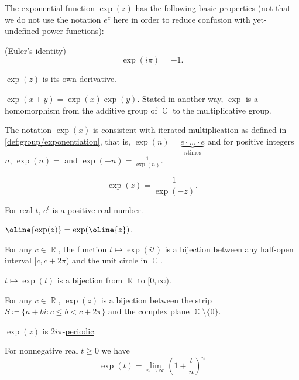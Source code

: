 \begin{proposition}\label{thm:def:exponential_function}
  The exponential function \( \exp(z) \) has the following basic properties (not that we do not use the notation \( e^z \) here in order to reduce confusion with yet-undefined power \hyperref[def:power_function]{functions}):

  \begin{thmenum}

     (Euler's identity)
    \begin{equation*}
      \exp(i \pi) = -1.
    \end{equation*}

     \( \exp(z) \) is its own derivative.

     \( \exp(x + y) = \exp(x) \exp(y) \). Stated in another way, \( \exp \) is a homomorphism from the additive group of \( \BbbC \) to the multiplicative group.

     The notation \( \exp(x) \) is consistent with iterated multiplication as defined in \cref{def:group/exponentiation}, that is, \( \exp(n) = \underbrace{e \cdot \ldots \cdot e}_{n \text{times}} \) and for positive integers \( n \), \( \exp(n) =  \) and \( \exp(-n) =\tfrac 1 {\exp(n)} \).

    \begin{equation*}
      \exp(z) = \frac 1 {\exp(-z)}.
    \end{equation*}

     For real \( t \), \( e^t \) is a positive real number.

     \( \oline{\exp(z)} = \exp(\oline{z}) \).

     For any \( c \in \BbbR \), the function \( t \mapsto \exp(it) \) is a bijection between any half-open interval \( [c, c + 2\pi) \) and the unit circle in \( \BbbC \).

     \( t \mapsto \exp(t) \) is a bijection from \( \BbbR \) to \( [0, \infty) \).

     For any \( c \in \BbbR \), \( \exp(z) \) is a bijection between the strip \( S \coloneqq \{ a + bi \colon c \leq b < c + 2\pi \} \) and the complex plane \( \BbbC \setminus \{ 0 \} \).

     \( \exp(z) \) is \( 2i\pi \)-\hyperref[def:periodic_function]{periodic}.

     For nonnegative real \( t \geq 0 \) we have
    \begin{equation*}
      \exp(t) = \lim_{n \to \infty} \left(1 + \frac t n \right)^n
    \end{equation*}
  \end{thmenum}
\end{proposition}

